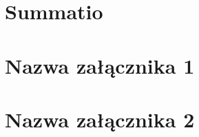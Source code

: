 \documentclass[
    left=2.5cm,         %
    right=2.5cm,        %
    top=2.5cm,          %
    bottom=3cm,         %
    bindingoffset=6mm,  %
    nohyphenation=true %
]{eiti/eiti-thesis} %
\begin{document}
\section{Summatio}      %
\kant[5-6]

\newpage


\newpage
\section*{Nazwa załącznika 1}
\lipsum[1]

\newpage
\section*{Nazwa załącznika 2}
\lipsum[1]

\newpage
\end{document}
